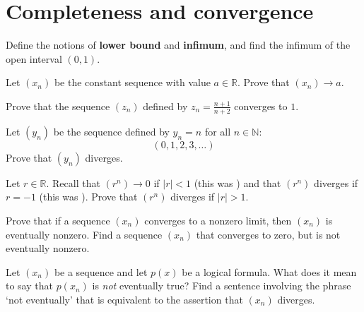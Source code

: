 \section{Completeness and convergence}


\begin{exercise}
\label{exDefineLowerBoundInfimum}
Define the notions of \textbf{lower bound} and \textbf{infimum}, and find the infimum of the open interval $(0,1)$.
\end{exercise}


\begin{exercise}
Let $(x_n)$ be the constant sequence with value $a \in \mathbb{R}$. Prove that $(x_n) \to a$.
\end{exercise}

\begin{exercise}
Prove that the sequence $(z_n)$ defined by $z_n=\frac{n+1}{n+2}$ converges to $1$.
\end{exercise}



\begin{exercise}
Let $(y_n)$ be the sequence defined by $y_n=n$ for all $n \in \mathbb{N}$:
\[ (0,1,2,3,\dots) \]
Prove that $(y_n)$ diverges.
\end{exercise}

\begin{exercise}
Let $r \in \mathbb{R}$. Recall that $(r^n) \to 0$ if $|r|<1$ (this was ) and that $(r^n)$ diverges if $r=-1$ (this was ). Prove that $(r^n)$ diverges if $|r|>1$.
\end{exercise}


\begin{exercise}
Prove that if a sequence $(x_n)$ converges to a nonzero limit, then $(x_n)$ is eventually nonzero. Find a sequence $(x_n)$ that converges to zero, but is not eventually nonzero.
\end{exercise}

\begin{exercise}
Let $(x_n)$ be a sequence and let $p(x)$ be a logical formula. What does it mean to say that $p(x_n)$ is \textit{not} eventually true? Find a sentence involving the phrase `not eventually' that is equivalent to the assertion that $(x_n)$ diverges.
\end{exercise}



